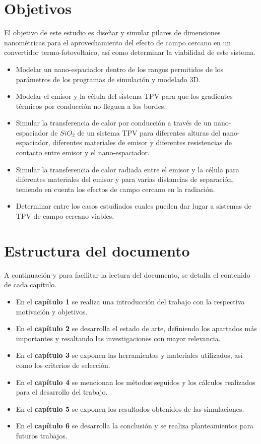 \section{Objetivos}
El objetivo de este estudio es diseñar y simular pilares de dimensiones nanométricas para el aprovechamiento del efecto de campo cercano en un convertidor termo-fotovoltaico, así como determinar la viabilidad de este sistema. 
\begin{itemize}
	\item Modelar un nano-espaciador dentro de los rangos permitidos de los parámetros de los programas de simulación y modelado 3D.
	\item Modelar el emisor y la célula del sistema TPV para que los gradientes térmicos por conducción no lleguen a los bordes.
	\item Simular la transferencia de calor por conducción a través de un nano-espaciador de $SiO_2$ de un sistema TPV para diferentes alturas del nano-espaciador, diferentes materiales de emisor y diferentes resistencias de contacto entre emisor y el nano-espaciador.
	\item Simular la transferencia de calor radiada entre el emisor y la célula para diferentes materiales del emisor y para varias distancias de separación, teniendo en cuenta los efectos de campo cercano en la radiación.
	\item Determinar entre los casos estudiados cuales pueden dar lugar a sistemas de TPV de campo cercano viables.
\end{itemize}


\section{Estructura del documento}

A continuación y para facilitar la lectura del documento, se detalla el contenido de cada capítulo.

\begin{itemize}
\item En el \textbf{capítulo 1} se realiza una introducción del trabajo con la respectiva motivación y objetivos.
\item En el \textbf{capítulo 2} se desarrolla el estado de arte, definiendo los apartados más importantes y resaltando las investigaciones con mayor relevancia.
\item En el \textbf{capítulo 3} se exponen las herramientas y materiales utilizados, así como los criterios de selección.
\item En el \textbf{capítulo 4} se mencionan los métodos seguidos y los cálculos realizados para el desarrollo del trabajo.
\item En el \textbf{capítulo 5} se exponen los resultados obtenidos de las simulaciones.
\item En el \textbf{capítulo 6} se desarrolla la conclusión y se realiza planteamientos para futuros trabajos.
\end{itemize}
